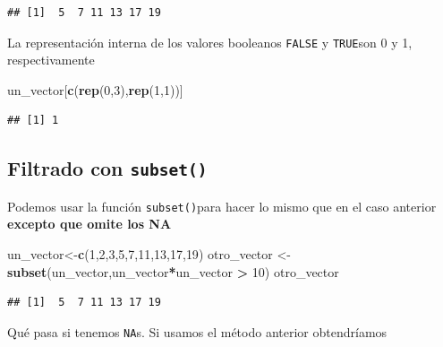 \documentclass[
]{book}
\newenvironment{Shaded}{\begin{snugshade}}{\end{snugshade}}
\newcommand{\DecValTok}[1]{\textcolor[rgb]{0.00,0.00,0.81}{#1}}
\newcommand{\FunctionTok}[1]{\textcolor[rgb]{0.13,0.29,0.53}{\textbf{#1}}}
\newcommand{\NormalTok}[1]{#1}
\newcommand{\OtherTok}[1]{\textcolor[rgb]{0.56,0.35,0.01}{#1}}
\newcommand{\SpecialCharTok}[1]{\textcolor[rgb]{0.81,0.36,0.00}{\textbf{#1}}}
\begin{document}
\begin{verbatim}
## [1]  5  7 11 13 17 19
\end{verbatim}

La representación interna de los valores booleanos \texttt{FALSE} y \texttt{TRUE}son 0 y 1, respectivamente

\begin{Shaded}
\begin{Highlighting}[]
\NormalTok{un\_vector[}\FunctionTok{c}\NormalTok{(}\FunctionTok{rep}\NormalTok{(}\DecValTok{0}\NormalTok{,}\DecValTok{3}\NormalTok{),}\FunctionTok{rep}\NormalTok{(}\DecValTok{1}\NormalTok{,}\DecValTok{1}\NormalTok{))]}
\end{Highlighting}
\end{Shaded}

\begin{verbatim}
## [1] 1
\end{verbatim}

\subsection{\texorpdfstring{Filtrado con \texttt{subset()}}{Filtrado con subset()}}\label{filtrado-con-subset}

Podemos usar la función \texttt{subset()}para hacer lo mismo que en el caso anterior \textbf{excepto que omite los NA}

\begin{Shaded}
\begin{Highlighting}[]
\NormalTok{un\_vector}\OtherTok{\textless{}{-}}\FunctionTok{c}\NormalTok{(}\DecValTok{1}\NormalTok{,}\DecValTok{2}\NormalTok{,}\DecValTok{3}\NormalTok{,}\DecValTok{5}\NormalTok{,}\DecValTok{7}\NormalTok{,}\DecValTok{11}\NormalTok{,}\DecValTok{13}\NormalTok{,}\DecValTok{17}\NormalTok{,}\DecValTok{19}\NormalTok{) }
\NormalTok{otro\_vector }\OtherTok{\textless{}{-}} \FunctionTok{subset}\NormalTok{(un\_vector,un\_vector}\SpecialCharTok{*}\NormalTok{un\_vector }\SpecialCharTok{\textgreater{}} \DecValTok{10}\NormalTok{)   }
\NormalTok{otro\_vector}
\end{Highlighting}
\end{Shaded}

\begin{verbatim}
## [1]  5  7 11 13 17 19
\end{verbatim}

Qué pasa si tenemos \texttt{NA}s. Si usamos el método anterior obtendríamos
\end{document}
